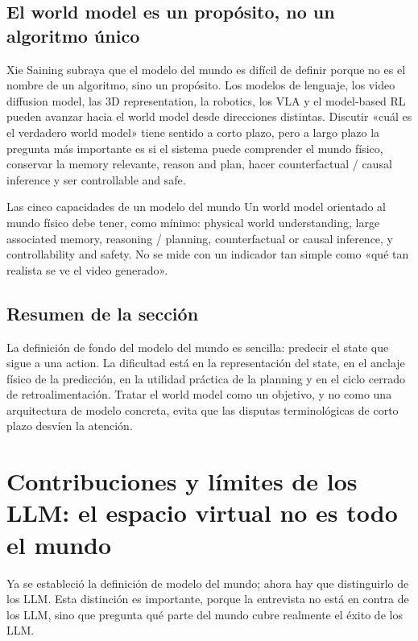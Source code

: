 \documentclass[a4paper]{article}
\begin{document}
\subsection{El world model es un propósito, no un algoritmo único}

Xie Saining subraya que el modelo del mundo es difícil de definir porque no es el nombre de un algoritmo, sino un propósito. Los modelos de lenguaje, los video diffusion model, las 3D representation, la robotics, los VLA y el model-based RL pueden avanzar hacia el world model desde direcciones distintas. Discutir «cuál es el verdadero world model» tiene sentido a corto plazo, pero a largo plazo la pregunta más importante es si el sistema puede comprender el mundo físico, conservar la memory relevante, reason and plan, hacer counterfactual / causal inference y ser controllable and safe.

\begin{importantbox}{Las cinco capacidades de un modelo del mundo}
Un world model orientado al mundo físico debe tener, como mínimo: physical world understanding, large associated memory, reasoning / planning, counterfactual or causal inference, y controllability and safety. No se mide con un indicador tan simple como «qué tan realista se ve el video generado».
\end{importantbox}

\subsection{Resumen de la sección}

La definición de fondo del modelo del mundo es sencilla: predecir el state que sigue a una action. La dificultad está en la representación del state, en el anclaje físico de la predicción, en la utilidad práctica de la planning y en el ciclo cerrado de retroalimentación. Tratar el world model como un objetivo, y no como una arquitectura de modelo concreta, evita que las disputas terminológicas de corto plazo desvíen la atención.
\section{Contribuciones y límites de los LLM: el espacio virtual no es todo el mundo}

Ya se estableció la definición de modelo del mundo; ahora hay que distinguirlo de los LLM. Esta distinción es importante, porque la entrevista no está en contra de los LLM, sino que pregunta qué parte del mundo cubre realmente el éxito de los LLM.
\end{document}
